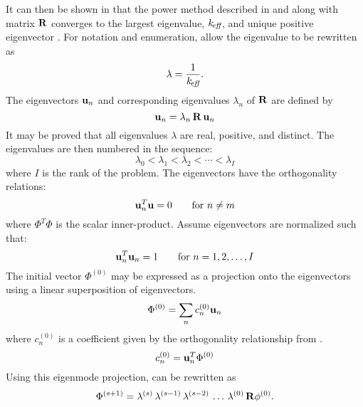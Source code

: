     It can then be shown in that the power method
    described in  and
    along with matrix $\mathbf{R}$ converges to the largest eigenvalue, $k_{\!\mbox{\scriptsize \em eff}}$, and
    unique positive eigenvector \cite{nakamura}. For notation and enumeration,
    allow the eigenvalue to be rewritten as
    \begin{equation}
      \label{eq:lambda}
      \lambda = \frac{1}{k_{\!\mbox{\scriptsize \em eff}}}.
    \end{equation}
    The eigenvectors $\mathbf{u}_n$ and
    corresponding eigenvalues $\lambda_n$ of $\mathbf{R}$ are defined by
    \begin{equation}
      \label{eq:eigen_definition}
      \mathbf{u}_n = \lambda_n \, \mathbf{R} \, \mathbf{u}_n
    \end{equation}
    It may be proved that all eigenvalues $\lambda$ are real, positive, and 
    distinct. The eigenvalues are then numbered in the sequence:
    \begin{equation}
      \label{eq:eigen_order}
      \lambda_0 < \lambda_1 < \lambda_2 < \cdots < \lambda_I
    \end{equation}
    where $I$ is the rank of the problem. The eigenvectors have the 
    orthogonality relations:
    \begin{equation}
      \label{eq:eigen_orthogonality}
      \mathbf{u}^T_n \mathbf{u}= 0  \qquad \text{for } n \ne m
    \end{equation}
    where $\Phi^T \Phi$ is the scalar inner-product. Assume eigenvectors are
    normalized such that:
    \begin{equation}
      \label{eq:eigen_normalization}
      \mathbf{u}_n^T \mathbf{u}_n = 1 \qquad \text{for } n = 1, 2, \ldots, I
    \end{equation}
    The initial vector $\Phi^{(0)}$ may be expressed as a projection onto the
    eigenvectors using a linear superposition of eigenvectors.
    \begin{equation}
      \label{eq:eigen_projection}
      \Phi^{(0)} = \sum_n c_n^{(0)} \mathbf{u}_n
    \end{equation}
    where $c_n^{(0)}$ is a coefficient given by the orthogonality relationship
    from .
    \begin{equation}
      \label{eq:eigen_cn}
      c_n^{(0)} = \mathbf{u}_n^T \Phi^{(0)}
    \end{equation}
    Using this eigenmode projection,  can be
    rewritten as 
    \begin{equation}
      \label{eq:phi_expand_begin}
      \Phi^{(s+1)} = \lambda^{(s)} \, \lambda^{(s-1)} \, \lambda^{(s-2)} \, 
        \ldots \, \lambda^{(0)} \, \mathbf{R} \phi^{(0)}.
    \end{equation}
